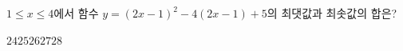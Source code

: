 $1\le x\le 4$에서 함수 $y=(2x-1)^2-4(2x-1)+5$의 최댓값과 최솟값의 합은?
\begin{choices32}{$24$}{$25$}{$26$}{$27$}{$28$}\end{choices32}
